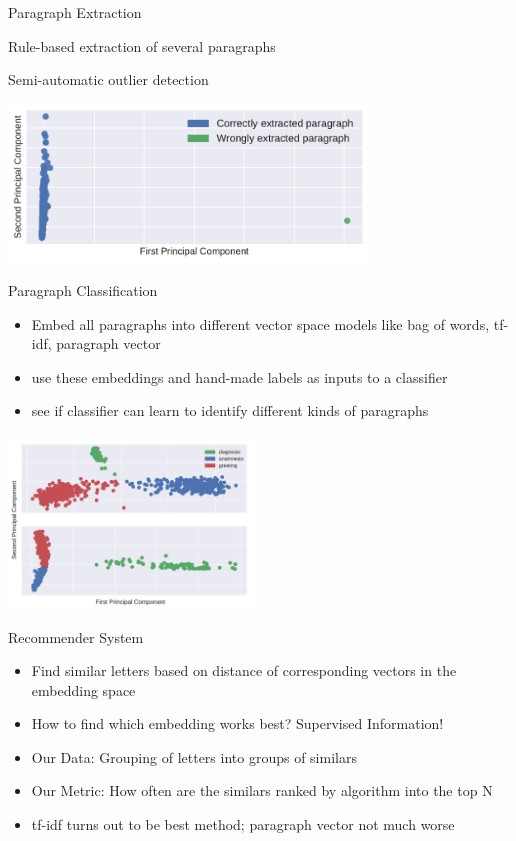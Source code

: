 \documentclass[10pt]{beamer}
\begin{document}
\begin{frame}{Paragraph Extraction}

Rule-based extraction of several paragraphs

Semi-automatic outlier detection

\begin{center}
\includegraphics[height=4.2cm]{bow_find_odd}
\end{center}

\end{frame}

\begin{frame}{Paragraph Classification}
	\begin{itemize}
		\item Embed all paragraphs into different vector space models like bag of words, tf-idf, paragraph vector
		\item use these embeddings and hand-made labels as inputs to a classifier
		\item see if classifier can learn to identify different kinds of paragraphs
	\end{itemize}

\begin{center}
	\includegraphics[height=4.6cm]{para2vec_tfidf_pca}
\end{center}	

\end{frame}


\begin{frame}{Recommender System}
	
	\begin{itemize}
		\item Find similar letters based on distance of corresponding vectors in the embedding space
		\item How to find which embedding works best? Supervised Information!
		\item Our Data: Grouping of letters into groups of similars
		\item Our Metric: How often are the similars ranked by algorithm into the top N
		\item tf-idf turns out to be best method; paragraph vector not much worse
	\end{itemize}
	
\end{frame}
\end{document}
